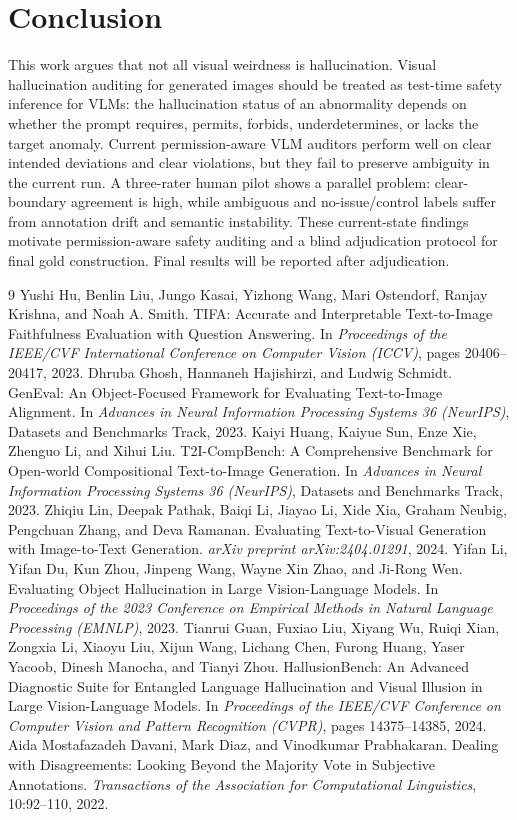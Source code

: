 \documentclass[11pt]{article}
\begin{document}
\section{Conclusion}

This work argues that not all visual weirdness is hallucination. Visual hallucination auditing for generated images should be treated as test-time safety inference for VLMs: the hallucination status of an abnormality depends on whether the prompt requires, permits, forbids, underdetermines, or lacks the target anomaly. Current permission-aware VLM auditors perform well on clear intended deviations and clear violations, but they fail to preserve ambiguity in the current run. A three-rater human pilot shows a parallel problem: clear-boundary agreement is high, while ambiguous and no-issue/control labels suffer from annotation drift and semantic instability. These current-state findings motivate permission-aware safety auditing and a blind adjudication protocol for final gold construction. Final results will be reported after adjudication.

\begin{thebibliography}{9}
 Yushi Hu, Benlin Liu, Jungo Kasai, Yizhong Wang, Mari Ostendorf, Ranjay Krishna, and Noah A. Smith. TIFA: Accurate and Interpretable Text-to-Image Faithfulness Evaluation with Question Answering. In \emph{Proceedings of the IEEE/CVF International Conference on Computer Vision (ICCV)}, pages 20406--20417, 2023.
 Dhruba Ghosh, Hannaneh Hajishirzi, and Ludwig Schmidt. GenEval: An Object-Focused Framework for Evaluating Text-to-Image Alignment. In \emph{Advances in Neural Information Processing Systems 36 (NeurIPS)}, Datasets and Benchmarks Track, 2023.
 Kaiyi Huang, Kaiyue Sun, Enze Xie, Zhenguo Li, and Xihui Liu. T2I-CompBench: A Comprehensive Benchmark for Open-world Compositional Text-to-Image Generation. In \emph{Advances in Neural Information Processing Systems 36 (NeurIPS)}, Datasets and Benchmarks Track, 2023.
 Zhiqiu Lin, Deepak Pathak, Baiqi Li, Jiayao Li, Xide Xia, Graham Neubig, Pengchuan Zhang, and Deva Ramanan. Evaluating Text-to-Visual Generation with Image-to-Text Generation. \emph{arXiv preprint arXiv:2404.01291}, 2024.
 Yifan Li, Yifan Du, Kun Zhou, Jinpeng Wang, Wayne Xin Zhao, and Ji-Rong Wen. Evaluating Object Hallucination in Large Vision-Language Models. In \emph{Proceedings of the 2023 Conference on Empirical Methods in Natural Language Processing (EMNLP)}, 2023.
 Tianrui Guan, Fuxiao Liu, Xiyang Wu, Ruiqi Xian, Zongxia Li, Xiaoyu Liu, Xijun Wang, Lichang Chen, Furong Huang, Yaser Yacoob, Dinesh Manocha, and Tianyi Zhou. HallusionBench: An Advanced Diagnostic Suite for Entangled Language Hallucination and Visual Illusion in Large Vision-Language Models. In \emph{Proceedings of the IEEE/CVF Conference on Computer Vision and Pattern Recognition (CVPR)}, pages 14375--14385, 2024.
 Aida Mostafazadeh Davani, Mark Diaz, and Vinodkumar Prabhakaran. Dealing with Disagreements: Looking Beyond the Majority Vote in Subjective Annotations. \emph{Transactions of the Association for Computational Linguistics}, 10:92--110, 2022.
\end{thebibliography}
\end{document}
